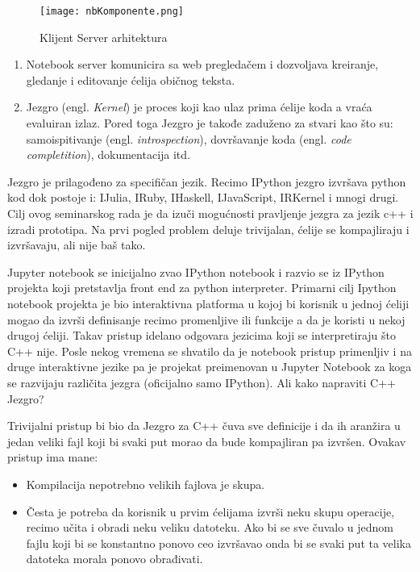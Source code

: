\documentclass[a4paper]{article}
\newcommand{\eng}[1]{(engl. \textit{#1})}
\begin{document}
{\begin{figure}[h!]
\begin{center}
\texttt{[image: nbKomponente.png]}
\end{center}
\caption{Klijent Server arhitektura}
\label{fig:Kli-Serv}
\end{figure}

\begin{enumerate}
  \item Notebook server komunicira sa web pregledačem i dozvoljava kreiranje, gledanje i editovanje ćelija običnog teksta.
  \item Jezgro \eng{Kernel} je proces koji kao ulaz prima ćelije koda a vraća evaluiran izlaz. Pored toga Jezgro je takođe  zaduženo za stvari
    kao što su: samoispitivanje \eng{introspection}, dovršavanje koda \eng{code completition}, dokumentacija itd.
\end{enumerate}

Jezgro je prilagođeno za specifičan jezik. Recimo IPython jezgro izvršava python kod dok postoje i:
IJulia, IRuby, IHaskell, IJavaScript, IRKernel i mnogi drugi.
Cilj ovog seminarskog rada je da izuči mogućnosti pravljenje jezgra za jezik c++ i izradi prototipa.
Na prvi pogled problem deluje trivijalan, ćelije se kompajliraju i izvršavaju, ali nije baš tako.

Jupyter notebook se inicijalno zvao IPython notebook i razvio se iz IPython projekta koji pretstavlja front end za
python interpreter. Primarni cilj Ipython notebook projekta je bio interaktivna platforma u kojoj
bi korisnik u jednoj ćeliji mogao da izvrši definisanje recimo promenljive ili funkcije a da je koristi u nekoj drugoj ćeliji.
Takav pristup idelano odgovara jezicima koji se interpretiraju što C++ nije.
Posle nekog vremena se shvatilo da je notebook pristup primenljiv i na druge interaktivne jezike pa je
projekat preimenovan u Jupyter Notebook za koga se razvijaju različita jezgra (oficijalno samo IPython).
Ali kako napraviti C++ Jezgro?

Trivijalni pristup bi bio da Jezgro za C++ čuva sve definicije i da ih aranžira u jedan veliki fajl koji bi svaki
put morao da bude kompajliran pa izvršen. Ovakav pristup ima mane:

\begin{itemize}
    \item Kompilacija nepotrebno velikih fajlova je skupa.
    \item 
      Česta je potreba da korisnik u prvim ćelijama izvrši neku skupu
      operacije, recimo učita i obradi neku veliku datoteku.
      Ako bi se sve čuvalo u jednom fajlu koji bi se konstantno
      ponovo ceo izvršavao onda bi se svaki put ta velika datoteka morala ponovo obrađivati.


\end{itemize}}
\end{document}
